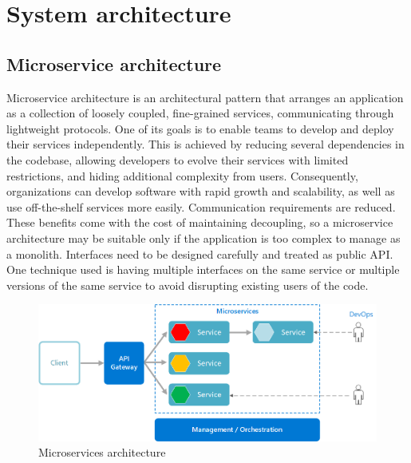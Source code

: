 \part{System architecture}

\chapter{Microservice architecture}

Microservice architecture is an architectural pattern that arranges an application as a collection of loosely coupled, fine-grained services, communicating through lightweight protocols. One of its goals is to enable teams to develop and deploy their services independently. This is achieved by reducing several dependencies in the codebase, allowing developers to evolve their services with limited restrictions, and hiding additional complexity from users. Consequently, organizations can develop software with rapid growth and scalability, as well as use off-the-shelf services more easily. Communication requirements are reduced. These benefits come with the cost of maintaining decoupling, so a microservice architecture may be suitable only if the application is too complex to manage as a monolith. Interfaces need to be designed carefully and treated as public API. One technique used is having multiple interfaces on the same service or multiple versions of the same service to avoid disrupting existing users of the code.

\begin{figure}
    \centering
    \includegraphics[width=1\linewidth]{images/microservices-architecture.png}
    \caption{Microservices architecture}
    \label{microservices-architecture}
\end{figure}

